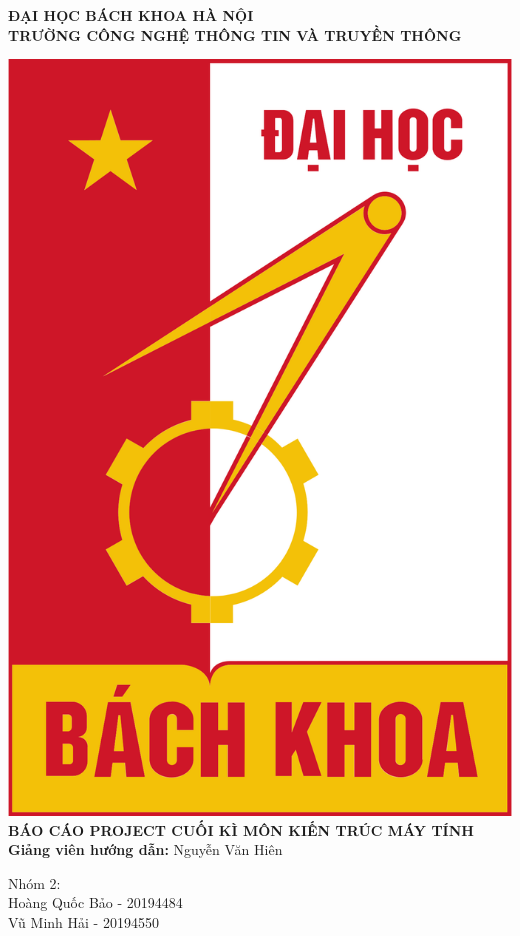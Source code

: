 \documentclass[12pt,a4paper,oneside]{article}
\begin{document}
\begin{center}
\begin{large}
\thispagestyle{empty}
\textbf{ĐẠI HỌC BÁCH KHOA HÀ NỘI}\\
\textbf{TRƯỜNG CÔNG NGHỆ THÔNG TIN VÀ TRUYỀN THÔNG}\\[0.5in]
\end{large}
\includegraphics[scale=0.2]{image/hust}\\[0.5in]
\textbf{{\Large BÁO CÁO PROJECT CUỐI KÌ MÔN KIẾN TRÚC MÁY TÍNH}}\\[0.25in]
\textbf{Giảng viên hướng dẫn: } Nguyễn Văn Hiên\\[0.5in]
\begin{flushleft}
Nhóm 2:\\
\qquad Hoàng Quốc Bảo - 20194484\\
\qquad Vũ Minh Hải - 20194550
\end{flushleft}
\end{center}
\pagebreak
\end{document}
